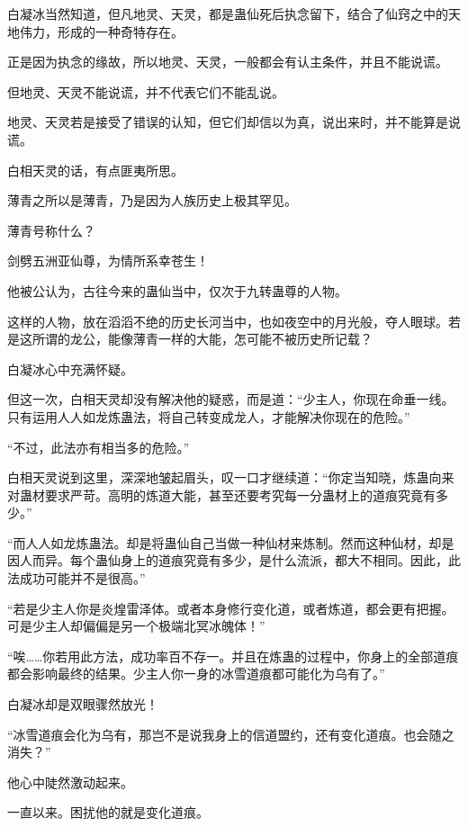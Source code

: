 
\begin{this_body}



白凝冰当然知道，但凡地灵、天灵，都是蛊仙死后执念留下，结合了仙窍之中的天地伟力，形成的一种奇特存在。

正是因为执念的缘故，所以地灵、天灵，一般都会有认主条件，并且不能说谎。

但地灵、天灵不能说谎，并不代表它们不能乱说。

地灵、天灵若是接受了错误的认知，但它们却信以为真，说出来时，并不能算是说谎。

白相天灵的话，有点匪夷所思。

薄青之所以是薄青，乃是因为人族历史上极其罕见。

薄青号称什么？

剑劈五洲亚仙尊，为情所系幸苍生！

他被公认为，古往今来的蛊仙当中，仅次于九转蛊尊的人物。

这样的人物，放在滔滔不绝的历史长河当中，也如夜空中的月光般，夺人眼球。若是这所谓的龙公，能像薄青一样的大能，怎可能不被历史所记载？

白凝冰心中充满怀疑。

但这一次，白相天灵却没有解决他的疑惑，而是道：“少主人，你现在命垂一线。只有运用人人如龙炼蛊法，将自己转变成龙人，才能解决你现在的危险。”

“不过，此法亦有相当多的危险。”

白相天灵说到这里，深深地皱起眉头，叹一口才继续道：“你定当知晓，炼蛊向来对蛊材要求严苛。高明的炼道大能，甚至还要考究每一分蛊材上的道痕究竟有多少。”

“而人人如龙炼蛊法。却是将蛊仙自己当做一种仙材来炼制。然而这种仙材，却是因人而异。每个蛊仙身上的道痕究竟有多少，是什么流派，都大不相同。因此，此法成功可能并不是很高。”

“若是少主人你是炎煌雷泽体。或者本身修行变化道，或者炼道，都会更有把握。可是少主人却偏偏是另一个极端北冥冰魄体！”

“唉……你若用此方法，成功率百不存一。并且在炼蛊的过程中，你身上的全部道痕都会影响最终的结果。少主人你一身的冰雪道痕都可能化为乌有了。”

白凝冰却是双眼骤然放光！

“冰雪道痕会化为乌有，那岂不是说我身上的信道盟约，还有变化道痕。也会随之消失？”

他心中陡然激动起来。

一直以来。困扰他的就是变化道痕。


\end{this_body}
